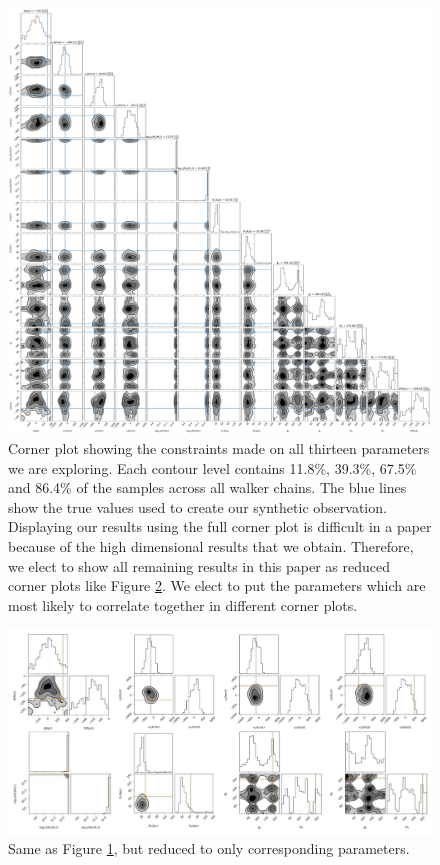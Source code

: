 \begin{figure}
\centering
\includegraphics[width=\textwidth]{Chapter1/figures/Arp240-full-corner.pdf}
\caption[Corner plot showing the constraints made on all thirteen parameters we are exploring.]{Corner plot showing the constraints made on all thirteen parameters we are exploring. Each contour level contains 11.8\%, 39.3\%, 67.5\% and 86.4\% of the samples across all walker chains. The blue lines show the true values used to create our synthetic observation. Displaying our results using the full corner plot is difficult in a paper because of the high dimensional results that we obtain. Therefore, we elect to show all remaining results in this paper as reduced corner plots like Figure \ref{fig:arp240_corner_plot}. We elect to put the parameters which are most likely to correlate together in different corner plots.}
\label{fig:corner_plot}
\end{figure}

\begin{figure}
\centering
\includegraphics[width=\textwidth]{Chapter1/figures/Arp240-red-corner.pdf}
\caption[Same as Figure \ref{fig:corner_plot}, but reduced to only corresponding parameters.]{Same as Figure \ref{fig:corner_plot}, but reduced to only corresponding parameters.}
\label{fig:arp240_corner_plot}
\end{figure}

